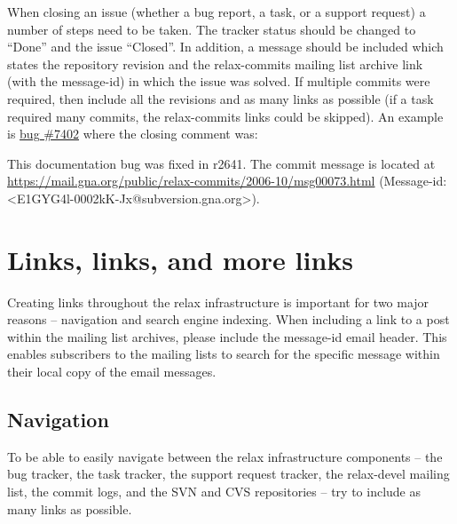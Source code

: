 When closing an issue (whether a bug report, a task, or a support request) a number of steps need to be taken.  The tracker status should be changed to ``Done'' and the issue ``Closed''.  In addition, a message should be included which states the repository revision and the relax-commits mailing list archive link (with the message-id) in which the issue was solved.  If multiple commits were required, then include all the revisions and as many links as possible (if a task required many commits, the relax-commits links could be skipped).  An example is \href{https://gna.org/bugs/?7402}{bug \#7402} where the closing comment was:

\begin{exampleenv}
This documentation bug was fixed in r2641. The commit message is located at \href{https://mail.gna.org/public/relax-commits/2006-10/msg00073.html}{https://mail.gna.org/public/relax-commits/2006-10/msg00073.html} (Message-id: <E1GYG4l-0002kK-Jx@subversion.gna.org>).
\end{exampleenv}




\section{Links, links, and more links}

Creating links throughout the relax infrastructure is important for two major reasons -- navigation and search engine indexing.  When including a link to a post within the mailing list archives, please include the message-id email header.  This enables subscribers to the mailing lists to search for the specific message within their local copy of the email messages.



\subsection{Navigation}

To be able to easily navigate between the relax infrastructure components -- the bug tracker, the task tracker, the support request tracker, the relax-devel mailing list, the commit logs, and the SVN and CVS repositories -- try to include as many links as possible.

